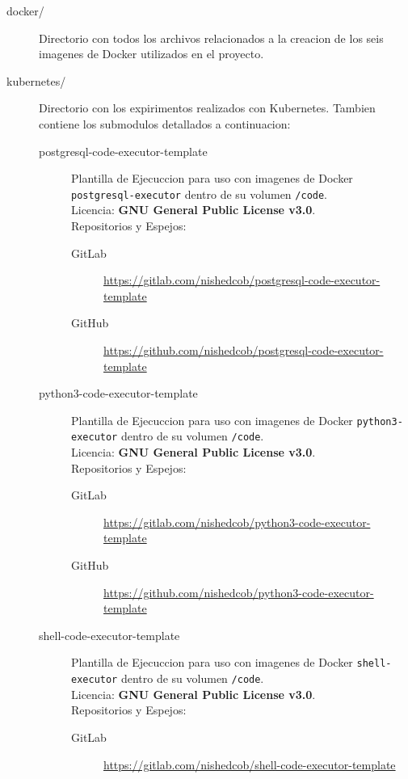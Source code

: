 \begin{description}
\begin{description}
        \item[docker/] Directorio con todos los archivos relacionados a la creacion de los seis imagenes de Docker utilizados en el proyecto.
        \item[kubernetes/] Directorio con los expirimentos realizados con Kubernetes. Tambien contiene los submodulos detallados a continuacion:
        \begin{description}
        	\item[postgresql-code-executor-template] Plantilla de Ejecuccion para uso con imagenes de Docker \texttt{postgresql-executor} dentro de su volumen \texttt{/code}.\\
            Licencia: \textbf{GNU General Public License v3.0}. \\
            Repositorios y Espejos:
            \begin{description}
            	\item[GitLab] \sloppy \url{https://gitlab.com/nishedcob/postgresql-code-executor-template}
                \item[GitHub] \sloppy \url{https://github.com/nishedcob/postgresql-code-executor-template}
            \end{description}
        	\item[python3-code-executor-template] Plantilla de Ejecuccion para uso con imagenes de Docker \texttt{python3-executor} dentro de su volumen \texttt{/code}.\\
            Licencia: \textbf{GNU General Public License v3.0}. \\
            Repositorios y Espejos:
            \begin{description}
            	\item[GitLab] \sloppy \url{https://gitlab.com/nishedcob/python3-code-executor-template}
                \item[GitHub] \sloppy \url{https://github.com/nishedcob/python3-code-executor-template}
            \end{description}
        	\item[shell-code-executor-template] Plantilla de Ejecuccion para uso con imagenes de Docker \texttt{shell-executor} dentro de su volumen \texttt{/code}.\\
            Licencia: \textbf{GNU General Public License v3.0}. \\
            Repositorios y Espejos:
            \begin{description}
            	\item[GitLab] \sloppy \url{https://gitlab.com/nishedcob/shell-code-executor-template}

\end{description}
\end{description}
\end{description}
\end{description}

